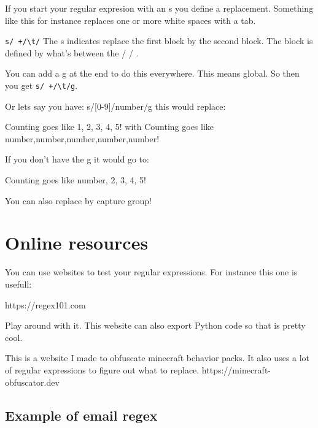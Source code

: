 \documentclass[
  11pt,
  british,
]{article}
\begin{document}
If you start your regular expresion with an s you define a replacement.
Something like this for instance replaces one or more white spaces with
a tab.

\texttt{s/\ +/\textbackslash{}t/} The s indicates replace the first
block by the second block. The block is defined by what's between the /
/ .

You can add a g at the end to do this everywhere. This means global. So
then you get \texttt{s/\ +/\textbackslash{}t/g}.

Or lets say you have: s/{[}0-9{]}/\textbar number\textbar/g this would
replace:

Counting goes like 1, 2, 3, 4, 5! with Counting goes like
\textbar number\textbar,\textbar number\textbar,\textbar number\textbar,\textbar number\textbar,\textbar number\textbar!

If you don't have the g it would go to:

Counting goes like \textbar number\textbar, 2, 3, 4, 5!

You can also replace by capture group!

\hypertarget{online-resources}{%
\section{Online resources}\label{online-resources}}

You can use websites to test your regular expressions. For instance this
one is usefull:

https://regex101.com

Play around with it. This website can also export Python code so that is
pretty cool.

This is a website I made to obfuscate minecraft behavior packs. It also
uses a lot of regular expressions to figure out what to replace.
https://minecraft-obfuscator.dev

\hypertarget{example-of-email-regex}{%
\subsection{Example of email regex}\label{example-of-email-regex}}
\end{document}

